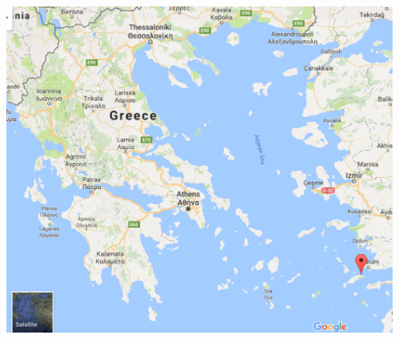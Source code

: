 \documentclass{beamer}
\begin{document}
\begin{frame}
    \begin{center}
    \begin{columns}
    \begin{column}{.33\textwidth}
    \includegraphics[width=1.6\textwidth, height=1.5\textwidth]{static/greece.png}
    \end{column}

    \begin{column}{.005\textwidth}
    
    \end{column}


\end{columns}
\end{center}
\end{frame}
\end{document}
